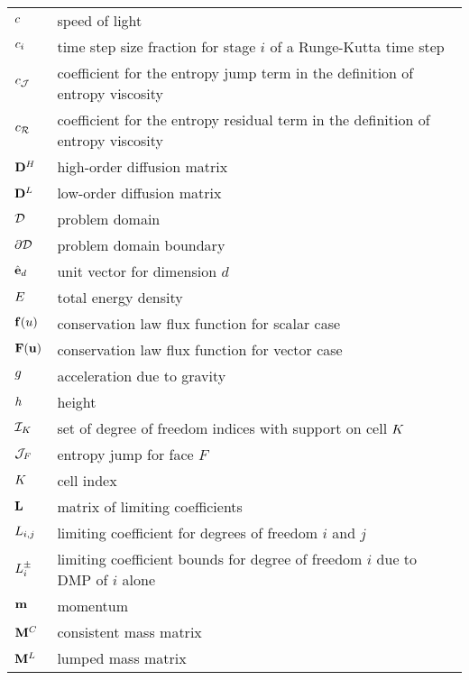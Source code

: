 \begin{center}
\begin{longtable}{l p{4.8in}}
$c$    & speed of light\\
$c_i$    & time step size fraction for stage $i$ of a
                     Runge-Kutta time step\\
$c_{\mathcal{J}}$ & coefficient for the entropy jump term in the definition
                     of entropy viscosity\\
$c_{\mathcal{R}}$ & coefficient for the entropy residual term in the
                         definition of entropy viscosity\\

$\highorderdiffusionmatrix$ & high-order diffusion matrix\\
$\loworderdiffusionmatrix$ & low-order diffusion matrix\\
$\mathcal{D}$          & problem domain\\
$\partial\mathcal{D}$  & problem domain boundary\\

$\hat{\mathbf{e}}_d$   & unit vector for dimension $d$\\
$E$     & total energy density\\
$\mathbf{f}(u)$  & conservation law flux function for scalar case\\
$\consfluxvector$  & conservation law flux function for vector case\\
$g$         & acceleration due to gravity\\
$h$          & height\\
$\indicescell$     & set of degree of freedom indices with support on
                     cell $K$\\
$\mathcal{J}_F$ & entropy jump for face $F$\\
$K$       & cell index\\

$\mathbf{L}$   & matrix of limiting coefficients\\
$L_{i,j}$ & limiting coefficient for degrees of freedom $i$
                         and $j$\\
$L^\pm_i$ & limiting coefficient bounds for degree of freedom $i$
                         due to DMP of $i$ alone\\
$\mathbf{m}$        & momentum\\
$\mathbf{M}^C$ & consistent mass matrix\\
$\mathbf{M}^L$ & lumped mass matrix\\


\end{longtable}
\end{center}

